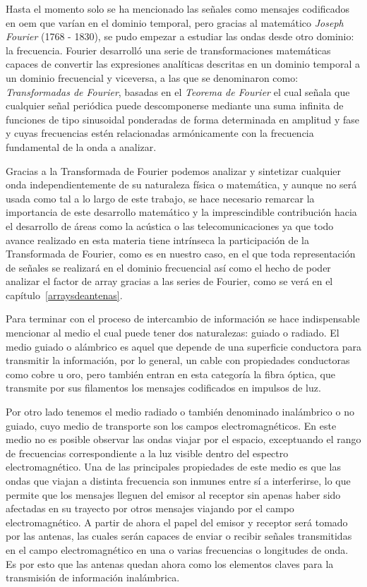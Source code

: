 \par Hasta el momento solo se ha mencionado las señales como mensajes codificados en \gls{oem} que varían en el dominio temporal, pero gracias al matemático \textit{Joseph Fourier} (1768 - 1830), se pudo empezar a estudiar las ondas desde otro dominio: la frecuencia. Fourier desarrolló una serie de transformaciones matemáticas capaces de convertir las expresiones analíticas descritas en un dominio temporal a un dominio frecuencial y viceversa, a las que se denominaron como: \textit{Transformadas de Fourier}, basadas en el \textit{Teorema de Fourier} el cual señala que cualquier señal periódica puede descomponerse mediante una suma infinita de funciones de tipo sinusoidal ponderadas de forma determinada en amplitud y fase y cuyas frecuencias estén relacionadas armónicamente con la frecuencia fundamental de la onda a analizar. 
\\
\par Gracias a la Transformada de Fourier podemos analizar y sintetizar cualquier onda independientemente de su naturaleza física o matemática, y aunque no será usada como tal a lo largo de este trabajo, se hace necesario remarcar la importancia de este desarrollo matemático y la imprescindible contribución hacia el desarrollo de áreas como la acústica o las telecomunicaciones ya que todo avance realizado en esta materia tiene intrínseca la participación de la Transformada de Fourier, como es en nuestro caso, en el que toda representación de señales se realizará en el dominio frecuencial así como el hecho de poder analizar el factor de array gracias a las series de Fourier, como se verá en el capítulo~\ref{arraysdeantenas}. 
\\
\par Para terminar con el proceso de intercambio de información se hace indispensable mencionar al medio el cual puede tener dos naturalezas: guiado o radiado. El medio guiado o alámbrico es aquel que depende de una superficie conductora para transmitir la información, por lo general, un cable con propiedades conductoras como cobre u oro, pero también entran en esta categoría la fibra óptica, que transmite por sus filamentos los mensajes codificados en impulsos de luz.  
\\
\par Por otro lado tenemos el medio radiado o también denominado inalámbrico o no guiado, cuyo medio de transporte son los campos electromagnéticos. En este medio no es posible observar las ondas viajar por el espacio, exceptuando el rango de frecuencias correspondiente a la luz visible dentro del espectro electromagnético. Una de las principales propiedades de este medio es que las ondas que viajan a distinta frecuencia son inmunes entre sí a interferirse, lo que permite que los mensajes lleguen del emisor al receptor sin apenas haber sido afectadas en su trayecto por otros mensajes viajando por el campo electromagnético. A partir de ahora el papel del emisor y receptor será tomado por las antenas, las cuales serán capaces de enviar o recibir señales transmitidas en el campo electromagnético en una o varias frecuencias o longitudes de onda. Es por esto que las antenas quedan ahora como los elementos claves para la transmisión de información inalámbrica. 

